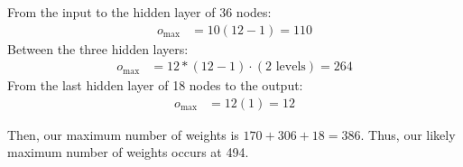\documentclass[10pt,letter]{article}
\begin{document}
	From the input to the hidden layer of 36 nodes:
	\begin{align*}
	o_{\text{max}} &= 10(12 - 1) = 110
	\end{align*}
	Between the three hidden layers:
	\begin{align*}
	o_{\text{max}} &= 12*(12-1) \cdot (2 \text{ levels}) = 264
	\end{align*}
	From the last hidden layer of 18 nodes to the output:
	\begin{align*}
	o_{\text{max}} &= 12(1) = 12
	\end{align*}

	Then, our maximum number of weights is $170 + 306 + 18 = 386$. Thus, our likely maximum number of weights occurs at 494.
\end{document}
